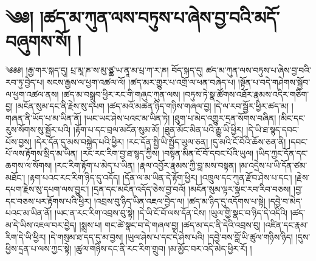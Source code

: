 \setcounter{footnote}{0} 
\chapter{༄༅། །ཚད་མ་ཀུན་ལས་བཏུས་པ་ཞེས་བྱ་བའི་མདོ་བཞུགས་སོ། །}༄༅༅། །རྒྱ་གར་སྐད་དུ། པྲ་མཱ་ཎ་ས་མུ་ཙྪ་ཡ་ནཱ་མ་པྲ་ཀ་ར་ཎ། བོད་སྐད་དུ། ཚད་མ་ཀུན་ལས་བཏུས་པ་ཞེས་བྱ་བའི་རབ་ཏུ་བྱེད་པ། སངས་རྒྱས་ལ་ཕྱག་འཚལ་ལོ། །ཚད་མར་གྱུར་པ་འགྲོ་ལ་ཕན་བཞེད་པ། །སྟོན་པ་བདེ་གཤེགས་སྐྱོབ་ལ་ཕྱག་འཚལ་ནས། །ཚད་མ་བསྒྲུབ་ཕྱིར་རང་གི་གཞུང་ཀུན་ལས། །བཏུས་ཏེ་སྣ་ཚོགས་འཐོར་རྣམས་འདིར་གཅིག་བྱ། །མངོན་སུམ་དང་ནི་རྗེས་སུ་དཔག །ཚད་མའོ་མཚན་ཉིད་གཉིས་གཞལ་བྱ། །དེ་ལ་རབ་སྦྱོར་ཕྱིར་ཚད་མ། །གཞན་ནི་ཡོད་པ་མ་ཡིན་ནོ། །ཡང་ཡང་ཤེས་པའང་མ་ཡིན་ཏེ། །ཐུག་པ་མེད་འགྱུར་དྲན་སོགས་བཞིན། །མིང་དང་རུས་སོགས་སུ་སྦྱོར་པའི། །རྟོག་པ་དང་བྲལ་མངོན་སུམ་མོ། །ཐུན་མོང་མིན་པའི་རྒྱུ་ཡི་ཕྱིར། །དེ་ཡི་ཐ་སྙད་དབང་པོས་བྱས། །དེར་དོན་དུ་མས་བསྐྱེད་པའི་ཕྱིར། །རང་དོན་སྤྱི་ཡི་སྤྱོད་ཡུལ་ཅན། །དུ་མའི་ངོ་བོའི་ཆོས་ཅན་ནི། །དབང་པོ་ལས་རྟོགས་སྲིད་མ་ཡིན། །རང་རང་རིག་བྱ་ཐ་སྙད་ཀྱིས། །བསྟན་མིན་ངོ་བོ་དབང་པོའི་ཡུལ། །ཡིད་ཀྱང་དོན་དང་ཆགས་ལ་སོགས། །རང་རིག་རྟོག་པ་མེད་པ་ཡིན། །རྣལ་འབྱོར་རྣམས་ཀྱི་བླ་མས་བསྟན། །མ་འདྲེས་པ་ཡི་དོན་ཙམ་མཐོང་། །རྟག་པའང་རང་རིག་ཉིད་དུ་འདོད། །དོན་ལ་མ་ཡིན་དེ་རྟོག་ཕྱིར། །འཁྲུལ་དང་ཀུན་རྫོབ་ཤེས་པ་དང་། །རྗེས་དཔག་རྗེས་སུ་དཔག་ལས་བྱུང་། །དྲན་དང་མངོན་འདོད་ཅེས་བྱ་བའོ། །མངོན་སུམ་ལྟར་སྣང་རབ་རིབ་བཅས། །བྱ་དང་བཅས་པར་རྟོགས་པའི་ཕྱིར། །འབྲས་བུ་ཉིད་ཡིན་འཇལ་བྱེད་ལ། །ཚད་མ་ཉིད་དུ་འདོགས་པ་སྟེ། །དབྱེ་བ་མེད་པའང་མ་ཡིན་ནོ། །ཡང་ན་རང་རིག་འབྲས་བུ་སྟེ། །དེ་ཡི་ངོ་བོ་ལས་དོན་ངེས། །ཡུལ་གྱི་སྣང་བ་ཉིད་དེ་འདིའི། །ཚད་མ་དེ་ཡིས་འཇལ་བར་བྱེད། །སྨྲས་པ། གང་ཚེ་སྣང་བ་དེ་གཞལ་བྱ། །ཚད་མ་དང་ནི་དེའི་འབྲས་བུ། །འཛིན་དང་རྣམ་རིག་དེ་ཡི་ཕྱིར། །དེ་གསུམ་ཐ་དད་དུ་མ་བྱས། །ཡུལ་ཤེས་པ་དང་དེ་ཤེས་པའི། །དབྱེ་བས་བློ་ཡི་ཚུལ་གཉིས་ཉིད། །དུས་ཕྱིས་དྲན་པ་ལས་ཀྱང་སྟེ། །ཚུལ་གཉིས་དང་ནི་རང་རིག་གྲུབ། །མ་མྱོང་བར་འདི་མེད་ཕྱིར་རོ། །

